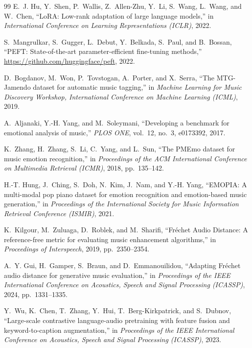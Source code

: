 \documentclass[11pt]{article}
\begin{document}
\begin{thebibliography}{99}
E.~J. Hu, Y.~Shen, P.~Wallis, Z.~Allen-Zhu, Y.~Li, S.~Wang, L.~Wang, and W.~Chen, ``LoRA: Low-rank adaptation of large language models,'' in \emph{International Conference on Learning Representations (ICLR)}, 2022.

S.~Mangrulkar, S.~Gugger, L.~Debut, Y.~Belkada, S.~Paul, and B.~Bossan, ``PEFT: State-of-the-art parameter-efficient fine-tuning methods,'' \url{https://github.com/huggingface/peft}, 2022.

D.~Bogdanov, M.~Won, P.~Tovstogan, A.~Porter, and X.~Serra, ``The MTG-Jamendo dataset for automatic music tagging,'' in \emph{Machine Learning for Music Discovery Workshop, International Conference on Machine Learning (ICML)}, 2019.

A.~Aljanaki, Y.-H. Yang, and M.~Soleymani, ``Developing a benchmark for emotional analysis of music,'' \emph{PLOS ONE}, vol.~12, no.~3, e0173392, 2017.

K.~Zhang, H.~Zhang, S.~Li, C.~Yang, and L.~Sun, ``The PMEmo dataset for music emotion recognition,'' in \emph{Proceedings of the ACM International Conference on Multimedia Retrieval (ICMR)}, 2018, pp.~135--142.

H.-T. Hung, J.~Ching, S.~Doh, N.~Kim, J.~Nam, and Y.-H. Yang, ``EMOPIA: A multi-modal pop piano dataset for emotion recognition and emotion-based music generation,'' in \emph{Proceedings of the International Society for Music Information Retrieval Conference (ISMIR)}, 2021.

K.~Kilgour, M.~Zuluaga, D.~Roblek, and M.~Sharifi, ``Fr\'echet Audio Distance: A reference-free metric for evaluating music enhancement algorithms,'' in \emph{Proceedings of Interspeech}, 2019, pp.~2350--2354.

A.~Y. Gui, H.~Gamper, S.~Braun, and D.~Emmanouilidou, ``Adapting Fr\'echet audio distance for generative music evaluation,'' in \emph{Proceedings of the IEEE International Conference on Acoustics, Speech and Signal Processing (ICASSP)}, 2024, pp.~1331--1335.

Y.~Wu, K.~Chen, T.~Zhang, Y.~Hui, T.~Berg-Kirkpatrick, and S.~Dubnov, ``Large-scale contrastive language-audio pretraining with feature fusion and keyword-to-caption augmentation,'' in \emph{Proceedings of the IEEE International Conference on Acoustics, Speech and Signal Processing (ICASSP)}, 2023.


\end{thebibliography}
\end{document}
